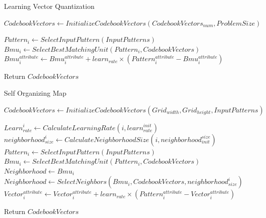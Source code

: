 \documentclass[a4paper]{article}
\begin{document}
  \begin{algorithm}
   \caption{Learning Vector Quantization ~\cite{learningvector3}}
    \begin{algorithmic}[1]
     \State $CodebookVectors \leftarrow InitializeCodebookVectors(CodebookVectors_{num},ProblemSize) $
     
    
            \State $Pattern_i \leftarrow SelectInputPattern(InputPatterns)$
            \State $Bmu_i \leftarrow SelectBestMatchingUnit(Pattern_i,CodebookVectors)$
            \State $Bmu_i^{attribute} \leftarrow Bmu_i^{attribute} + learn_{rate} \times (Pattern_i ^{attribute} - Bmu_i ^{attribute})  $
            \EndIf 
            \EndFor  
        \EndFor
        
       
       \State Return $CodebookVectors$



 

\end{algorithmic}
\end{algorithm}



  \begin{algorithm}
   \caption{Self Organizing Map ~\cite{som3} }
    \begin{algorithmic}[1]
     \State $CodebookVectors \leftarrow InitializeCodebookVectors(Grid_{width},Grid_{height},InputPatterns) $
     
    
            \State $Learn_{rate}^i \leftarrow CalculateLearningRate(i,learn_{rate}^{init})$
            \State $neighborhood_{size}^i \leftarrow CalculateNeighborhoodSize(i,neighborhood_{init}^{size})$
            \State $Pattern_i \leftarrow SelectInputPattern(InputPatterns)$
             \State $Bmu_i \leftarrow SelectBestMatchingUnit(Pattern_i,CodebookVectors)$
             \State $Neighborhood \leftarrow Bmu_i$
              \State $Neighborhood \leftarrow  SelectNeighbors(Bmu_i,CodebookVectors,neighborhood_{size}^i)$
            \State $Vector_i^{attribute} \leftarrow Vector_i^{attribute} + learn_{rate} \times (Pattern_i ^{attribute} - Vector_i ^{attribute})  $
            \EndFor
          
            
            \EndFor
           
        \EndFor
        
       
       \State Return $CodebookVectors$



 

\end{algorithmic}
\end{algorithm}
\end{document}
